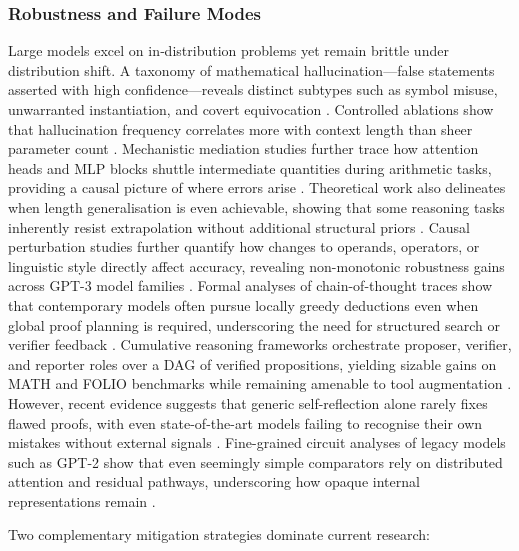 \documentclass[acmsmall,anonymous]{acmart}
\begin{document}
\subsubsection{Robustness and Failure Modes}\label{sec:robust}
Large models excel on in‐distribution problems yet remain brittle under distribution shift.  A taxonomy of mathematical hallucination—false statements asserted with high confidence—reveals distinct subtypes such as symbol misuse, unwarranted instantiation, and covert equivocation \cite{sun2024benchmarking}.  Controlled ablations show that hallucination frequency correlates more with context length than sheer parameter count \cite{yang2023steamroller}.  Mechanistic mediation studies further trace how attention heads and MLP blocks shuttle intermediate quantities during arithmetic tasks, providing a causal picture of where errors arise \cite{stolfo-2023-causal-mediation}.  Theoretical work also delineates when length generalisation is even achievable, showing that some reasoning tasks inherently resist extrapolation without additional structural priors \cite{xiao2023conditionslengthgeneralizationlearning}.  Causal perturbation studies further quantify how changes to operands, operators, or linguistic style directly affect accuracy, revealing non-monotonic robustness gains across GPT-3 model families \cite{stolfo-2023-causal}.  Formal analyses of chain-of-thought traces show that contemporary models often pursue locally greedy deductions even when global proof planning is required, underscoring the need for structured search or verifier feedback \cite{saparov-2023-greedy}.  Cumulative reasoning frameworks orchestrate proposer, verifier, and reporter roles over a DAG of verified propositions, yielding sizable gains on MATH and FOLIO benchmarks while remaining amenable to tool augmentation \cite{zhang-2025-cumulative-reasoning}.  However, recent evidence suggests that generic self-reflection alone rarely fixes flawed proofs, with even state-of-the-art models failing to recognise their own mistakes without external signals \cite{huang-2024-llm-self-correct}.  Fine-grained circuit analyses of legacy models such as GPT-2 show that even seemingly simple comparators rely on distributed attention and residual pathways, underscoring how opaque internal representations remain \cite{hanna-2023-greater-than}.  

Two complementary mitigation strategies dominate current research:
\end{document}
